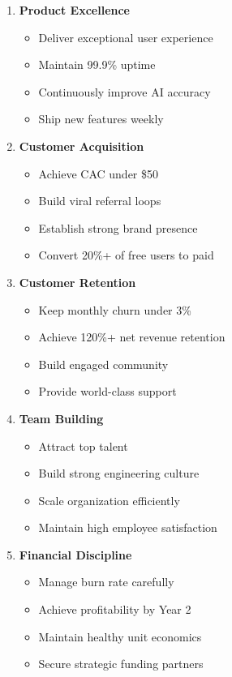 \begin{enumerate}
    \item \textbf{Product Excellence}
    \begin{itemize}
        \item Deliver exceptional user experience
        \item Maintain 99.9\% uptime
        \item Continuously improve AI accuracy
        \item Ship new features weekly
    \end{itemize}
    
    \item \textbf{Customer Acquisition}
    \begin{itemize}
        \item Achieve CAC under \$50
        \item Build viral referral loops
        \item Establish strong brand presence
        \item Convert 20\%+ of free users to paid
    \end{itemize}
    
    \item \textbf{Customer Retention}
    \begin{itemize}
        \item Keep monthly churn under 3\%
        \item Achieve 120\%+ net revenue retention
        \item Build engaged community
        \item Provide world-class support
    \end{itemize}
    
    \item \textbf{Team Building}
    \begin{itemize}
        \item Attract top talent
        \item Build strong engineering culture
        \item Scale organization efficiently
        \item Maintain high employee satisfaction
    \end{itemize}
    
    \item \textbf{Financial Discipline}
    \begin{itemize}
        \item Manage burn rate carefully
        \item Achieve profitability by Year 2
        \item Maintain healthy unit economics
        \item Secure strategic funding partners
    \end{itemize}
\end{enumerate}

